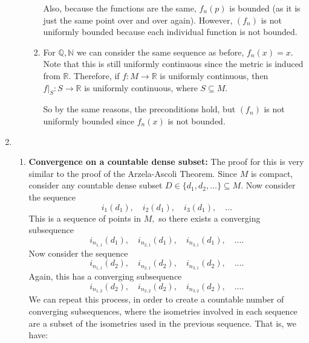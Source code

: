 \documentclass{article}
\numberwithin{equation}{section}
\begin{document}
\begin{enumerate}
\begin{enumerate}[label=(\alph*)]
\begin{enumerate}
            Also, because the functions are the same, $f_n(p)$ is bounded (as it is just the same point over and over again). However, $(f_n)$ is not uniformly bounded because each individual function is not bounded.
            \item For $\mathbb{Q},\mathbb{N}$ we can consider the same sequence as before, $f_n(x)=x.$ Note that this is still uniformly continuous since the metric is induced from $\mathbb{R}.$ Therefore, if $f:M\to \mathbb{R}$ is uniformly continuous, then $f|_S:S\to \mathbb{R}$ is uniformly continuous, where $S\subseteq M.$ 
            
            So by the same reasons, the preconditions hold, but $(f_n)$ is not uniformly bounded since $f_n(x)$ is not bounded.
        \end{enumerate}
    \end{enumerate}
    \newpage
    \item \begin{enumerate}[label=(\alph*)]
        \item \textbf{Convergence on a countable dense subset:} The proof for this is very similar to the proof of the Arzela-Ascoli Theorem. Since $M$ is compact, consider any countable dense subset $D \in \{d_1,d_2,\dots\} \subseteq M.$ Now consider the sequence 
        \begin{equation}
            i_{1}(d_1), \quad i_{2}(d_1),\quad i_{3}(d_1),\quad \dots
        \end{equation}
        This is a sequence of points in $M,$ so there exists a converging subsequence
        \begin{equation}
            i_{n_{1,1}}(d_1), \quad i_{n_{2,1}}(d_1),\quad i_{n_{3,1}}(d_1),\quad \dots.
        \end{equation}
        Now consider the sequence 
        \begin{equation}
            i_{n_{1,1}}(d_2), \quad i_{n_{2,1}}(d_2),\quad i_{n_{3,1}}(d_2),\quad \dots.
        \end{equation}
        Again, this has a converging subsequence
        \begin{equation}
            i_{n_{1,2}}(d_2), \quad i_{n_{2,2}}(d_2),\quad i_{n_{3,2}}(d_2),\quad \dots.
        \end{equation}
        We can repeat this process, in order to create a countable number of converging subsequences, where the isometries involved in each sequence are a subset of the isometries used in the previous sequence. That is, we have:
        \begin{align}

\end{align}
\end{enumerate}
\end{enumerate}
\end{document}
